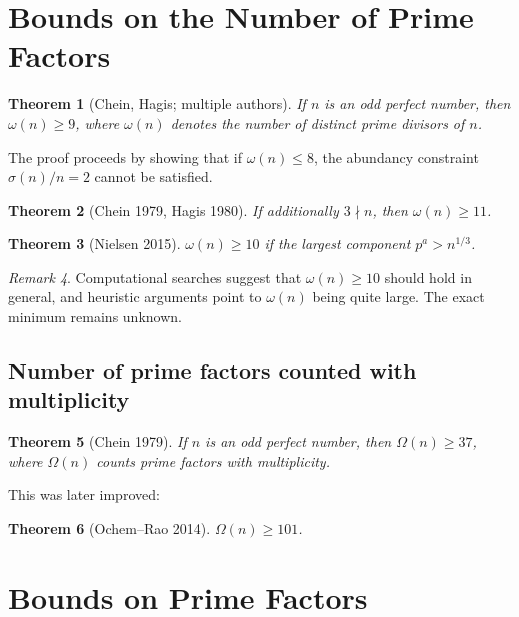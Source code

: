 \documentclass[12pt,a4paper]{amsart}
\newtheorem{theorem}{Theorem}[section]
\theoremstyle{definition}
\theoremstyle{remark}
\newtheorem{remark}[theorem]{Remark}
\begin{document}
\section{Bounds on the Number of Prime Factors}

\begin{theorem}[Chein, Hagis; multiple authors]
\label{thm:omega}
If $n$ is an odd perfect number, then $\omega(n) \geq 9$,
where $\omega(n)$ denotes the number of distinct prime divisors of $n$.
\end{theorem}

The proof proceeds by showing that if $\omega(n) \leq 8$, the abundancy
constraint $\sigma(n)/n = 2$ cannot be satisfied.

\begin{theorem}[Chein 1979, Hagis 1980]
If additionally $3 \nmid n$, then $\omega(n) \geq 11$.
\end{theorem}

\begin{theorem}[Nielsen 2015]
$\omega(n) \geq 10$ if the largest component $p^a > n^{1/3}$.
\end{theorem}

\begin{remark}
Computational searches suggest that $\omega(n) \geq 10$ should hold in general,
and heuristic arguments point to $\omega(n)$ being quite large.
The exact minimum remains unknown.
\end{remark}

\subsection{Number of prime factors counted with multiplicity}

\begin{theorem}[Chein 1979]
If $n$ is an odd perfect number, then $\Omega(n) \geq 37$,
where $\Omega(n)$ counts prime factors with multiplicity.
\end{theorem}

This was later improved:

\begin{theorem}[Ochem--Rao 2014]
$\Omega(n) \geq 101$.
\end{theorem}

\section{Bounds on Prime Factors}
\end{document}
